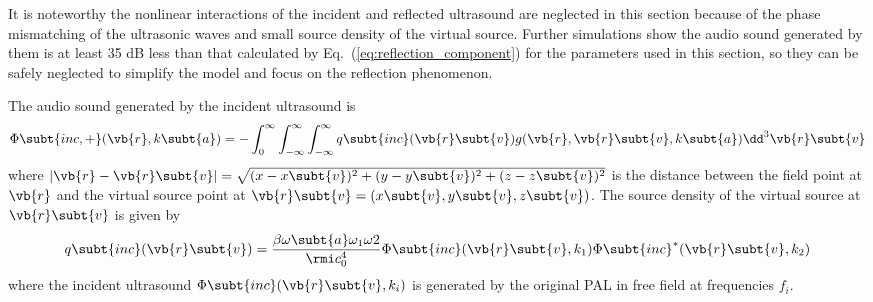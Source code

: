 It is noteworthy the nonlinear interactions of the incident and reflected ultrasound are neglected in this section because of the phase mismatching of the ultrasonic waves and small source density of the virtual source.
Further simulations show the audio sound generated by them is at least 35 dB less than that calculated by Eq.~(\ref{eq:reflection_component}) for the parameters used in this section, 
so they can be safely neglected to simplify the model and focus on the reflection phenomenon. 

The audio sound generated by the incident ultrasound is 
\begin{equation}
    \Phi\subt{inc,+}(\vb{r},k\subt{a})
    = -
    \int_0^\infty \int_{-\infty}^\infty \int_{-\infty}^\infty
    q\subt{inc}(\vb{r}\subt{v}) 
    g(\vb{r},\vb{r}\subt{v},k\subt{a})
    \dd^3 \vb{r}\subt{v}
    \label{eq:reflection_potential_inc_pos}
\end{equation}
where $|\vb{r}-\vb{r}\subt{v}| = \sqrt{(x-x\subt{v})^2 + (y-y\subt{v})^2 + (z-z\subt{v})^2}$ is the distance between the field point at $\vb{r}$ and the virtual source point at $\vb{r}\subt{v} = (x\subt{v},y\subt{v},z\subt{v})$.
The source density of the virtual source at $\vb{r}\subt{v}$ is given by 
\begin{equation}
    q\subt{inc} (\vb{r}\subt{v}) 
    = \frac{ \beta\omega\subt{a} \omega_1\omega2}{\rmi c_0^4}
    \Phi\subt{inc}(\vb{r}\subt{v}, k_1)
    \Phi\subt{inc}^*(\vb{r}\subt{v}, k_2)
\end{equation}
where the incident ultrasound $\Phi\subt{inc}(\vb{r}\subt{v}, k_i)$ is generated by the original PAL in free field at frequencies $f_i$. 

